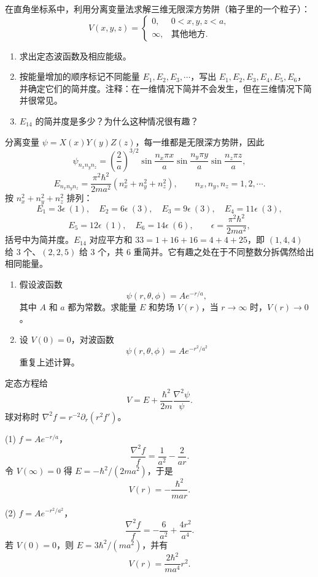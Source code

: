 \begin{question}
在直角坐标系中，利用分离变量法求解三维无限深方势阱（箱子里的一个粒子）：
\[
V(x,y,z)=\begin{cases}
0, & 0<x,y,z<a,\\
\infty, & \text{其他地方}.
\end{cases}
\]
\begin{enumerate}
\item 求出定态波函数及相应能级。
\item 按能量增加的顺序标记不同能量 $E_1,E_2,E_3,\cdots$，写出 $E_1,E_2,E_3,E_4,E_5,E_6$，并确定它们的简并度。注释：在一维情况下简并不会发生，但在三维情况下简并很常见。
\item $E_{14}$ 的简并度是多少？为什么这种情况很有趣？
\end{enumerate}
\end{question}
\begin{solution}

分离变量 $\psi=X(x)Y(y)Z(z)$，每一维都是无限深方势阱，因此
\[
\psi_{n_xn_yn_z}=\left(\frac{2}{a}\right)^{3/2}\sin\frac{n_x\pi x}{a}\sin\frac{n_y\pi y}{a}\sin\frac{n_z\pi z}{a},
\]
\[
E_{n_xn_yn_z}=\frac{\pi^2\hbar^2}{2ma^2}(n_x^2+n_y^2+n_z^2),\qquad n_x,n_y,n_z=1,2,\cdots .
\]
按 $n_x^2+n_y^2+n_z^2$ 排列：
\[
E_1=3\epsilon\ (1),\quad E_2=6\epsilon\ (3),\quad E_3=9\epsilon\ (3),\quad E_4=11\epsilon\ (3),
\]
\[
E_5=12\epsilon\ (1),\quad E_6=14\epsilon\ (6),\qquad \epsilon=\frac{\pi^2\hbar^2}{2ma^2},
\]
括号中为简并度。$E_{14}$ 对应平方和 $33=1+16+16=4+4+25$，即 $(1,4,4)$ 给 3 个、$(2,2,5)$ 给 3 个，共 6 重简并。它有趣之处在于不同整数分拆偶然给出相同能量。

\end{solution}

\begin{question}
\begin{enumerate}
\item 假设波函数
\[
\psi(r,\theta,\phi)=A e^{-r/a},
\]
其中 $A$ 和 $a$ 都为常数。求能量 $E$ 和势场 $V(r)$，当 $r\to\infty$ 时，$V(r)\to0$。
\item 设 $V(0)=0$，对波函数
\[
\psi(r,\theta,\phi)=A e^{-r^2/a^2}
\]
重复上述计算。
\end{enumerate}
\end{question}
\begin{solution}

定态方程给
\[
V=E+\frac{\hbar^2}{2m}\frac{\nabla^2\psi}{\psi}.
\]
球对称时 $\nabla^2 f=r^{-2}\partial_r(r^2f')$。

(1) $f=Ae^{-r/a}$，
\[
\frac{\nabla^2f}{f}=\frac{1}{a^2}-\frac{2}{ar}.
\]
令 $V(\infty)=0$ 得 $E=-\hbar^2/(2ma^2)$，于是
\[
V(r)=-\frac{\hbar^2}{mar}.
\]

(2) $f=Ae^{-r^2/a^2}$，
\[
\frac{\nabla^2f}{f}=-\frac{6}{a^2}+\frac{4r^2}{a^4}.
\]
若 $V(0)=0$，则 $E=3\hbar^2/(ma^2)$，并有
\[
V(r)=\frac{2\hbar^2}{ma^4}r^2.
\]

\end{solution}

